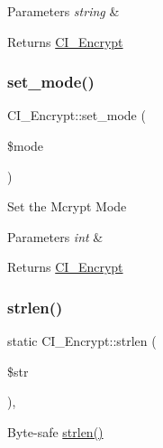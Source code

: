 \begin{DoxyParams}{Parameters}
{\em string} & \\
\hline
\end{DoxyParams}
\begin{DoxyReturn}{Returns}
\mbox{\hyperlink{class_c_i___encrypt}{C\+I\+\_\+\+Encrypt}} 
\end{DoxyReturn}
\mbox{\label{class_c_i___encrypt_a7f8ec4d2688450a895ab2803a24e4edc}} 
\subsubsection{\texorpdfstring{set\+\_\+mode()}{set\_mode()}}
{\footnotesize\ttfamily C\+I\+\_\+\+Encrypt\+::set\+\_\+mode (\begin{DoxyParamCaption}\item[{}]{\$mode }\end{DoxyParamCaption})}

Set the Mcrypt Mode


\begin{DoxyParams}{Parameters}
{\em int} & \\
\hline
\end{DoxyParams}
\begin{DoxyReturn}{Returns}
\mbox{\hyperlink{class_c_i___encrypt}{C\+I\+\_\+\+Encrypt}} 
\end{DoxyReturn}
\mbox{\label{class_c_i___encrypt_a48d4db55bad3f6788a365b5644ca4b28}} 
\subsubsection{\texorpdfstring{strlen()}{strlen()}}
{\footnotesize\ttfamily static C\+I\+\_\+\+Encrypt\+::strlen (\begin{DoxyParamCaption}\item[{}]{\$str }\end{DoxyParamCaption})\hspace{0.3cm}{\ttfamily [static]}, {\ttfamily [protected]}}

Byte-\/safe \mbox{\hyperlink{class_c_i___encrypt_a48d4db55bad3f6788a365b5644ca4b28}{strlen()}}


